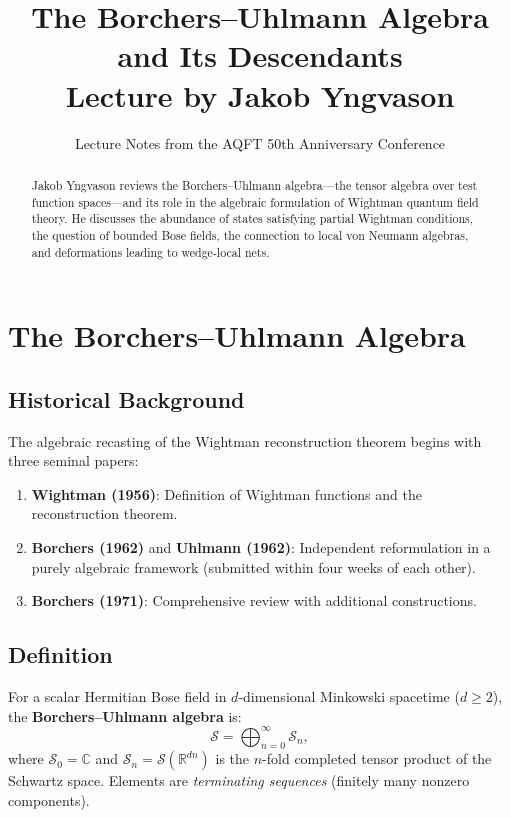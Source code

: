 \documentclass[11pt,a4paper]{article}
\title{\textbf{The Borchers--Uhlmann Algebra\\and Its Descendants}\\[6pt]
\large Lecture by Jakob Yngvason}
\author{Lecture Notes from the AQFT 50th Anniversary Conference}
\date{}
\begin{document}
\maketitle

\begin{abstract}
Jakob Yngvason reviews the Borchers--Uhlmann algebra---the tensor algebra over test
function spaces---and its role in the algebraic formulation of Wightman quantum field
theory. He discusses the abundance of states satisfying partial Wightman conditions,
the question of bounded Bose fields, the connection to local von Neumann algebras,
and deformations leading to wedge-local nets.
\end{abstract}

\tableofcontents

\section{The Borchers--Uhlmann Algebra}

\subsection{Historical Background}

The algebraic recasting of the Wightman reconstruction theorem begins with
three seminal papers:
\begin{enumerate}[nosep]
  \item \textbf{Wightman (1956)}: Definition of Wightman functions and the
        reconstruction theorem.
  \item \textbf{Borchers (1962)} and \textbf{Uhlmann (1962)}: Independent
        reformulation in a purely algebraic framework (submitted within
        four weeks of each other).
  \item \textbf{Borchers (1971)}: Comprehensive review with additional
        constructions.
\end{enumerate}

\subsection{Definition}

For a scalar Hermitian Bose field in $d$-dimensional Minkowski spacetime
($d \geq 2$), the \textbf{Borchers--Uhlmann algebra} is:
\begin{equation}
  \mathcal{S} = \bigoplus_{n=0}^{\infty} \mathcal{S}_n,
\end{equation}
where $\mathcal{S}_0 = \mathbb{C}$ and $\mathcal{S}_n = \mathcal{S}(\mathbb{R}^{dn})$
is the $n$-fold completed tensor product of the Schwartz space. Elements are
\emph{terminating sequences} (finitely many nonzero components).
\end{document}
